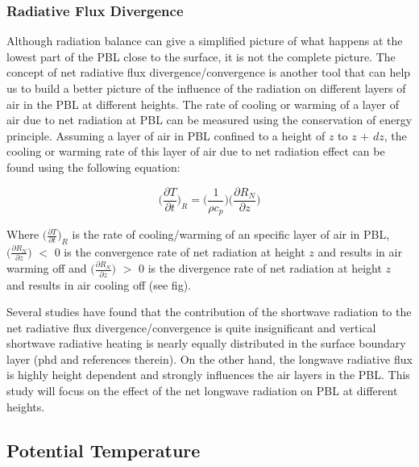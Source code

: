 \documentclass[a4paper,12pt]{article}
\numberwithin{equation}{section} %
\begin{document}
\subsubsection{Radiative Flux Divergence}

Although radiation balance can give a simplified picture of what happens at the lowest part of the PBL close to the surface, it is not the complete picture. The concept of net radiative flux divergence/convergence is another tool that can help us to build a better picture of the influence of the radiation on different layers of air in the PBL at different heights. The rate of cooling or warming of a layer of air due to net radiation at PBL can be measured using the conservation of energy principle. Assuming a layer of air in PBL confined to a height of $z$ to $z$ $+$ $dz$, the cooling or warming rate of this layer of air due to net radiation effect can be found using the following equation: 

\vspace{0.25cm}
\begin{equation}
\Big(\frac{\partial T}{\partial t}\Big)_R = \Big(\frac{1}{\rho c_p}\Big)\Big(\frac{\partial R_N}{\partial z}\Big)
\end{equation}
\vspace{0.25cm}

Where $\Big(\frac{\partial T}{\partial t}\Big)_R$ is the rate of cooling/warming of an specific layer of air in PBL, $\Big(\frac{\partial R_N}{\partial z}\Big)$ $<$ 0 is the convergence rate of net radiation at height $z$ and results in air warming off and $\Big(\frac{\partial R_N}{\partial z}\Big)$ $>$ 0 is the divergence rate of net radiation at height $z$ and results in air cooling off (see fig).

Several studies have found that the contribution of the shortwave radiation to the net radiative flux divergence/convergence is quite insignificant and vertical shortwave radiative heating is nearly equally distributed in the surface boundary layer (phd and references therein). On the other hand, the longwave radiative flux is highly height dependent and strongly influences the air layers in the PBL. This study will focus on the effect of the net longwave radiation on PBL at different heights.




\subsection{Potential Temperature}
\end{document}
